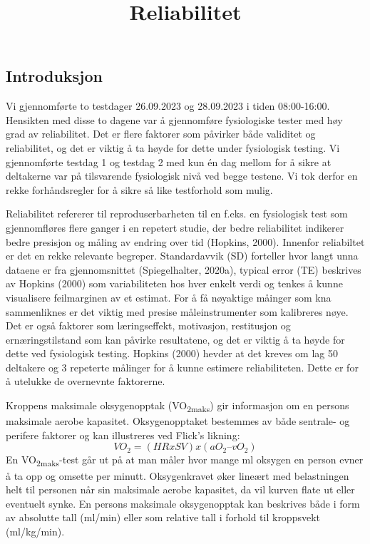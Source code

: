 \documentclass[
  letterpaper,
  DIV=11,
  numbers=noendperiod]{scrartcl}
\title{Reliabilitet}
\author{}
\date{}
\begin{document}
\maketitle
\ifdefined\Shaded\renewenvironment{Shaded}{\begin{tcolorbox}[enhanced, boxrule=0pt, sharp corners, interior hidden, frame hidden, borderline west={3pt}{0pt}{shadecolor}, breakable]}{\end{tcolorbox}}\fi

\hypertarget{introduksjon}{%
\subsection{Introduksjon}\label{introduksjon}}

Vi gjennomførte to testdager 26.09.2023 og 28.09.2023 i tiden
08:00-16:00. Hensikten med disse to dagene var å gjennomføre
fysiologiske tester med høy grad av reliabilitet. Det er flere faktorer
som påvirker både validitet og reliabilitet, og det er viktig å ta høyde
for dette under fysiologisk testing. Vi gjennomførte testdag 1 og
testdag 2 med kun én dag mellom for å sikre at deltakerne var på
tilsvarende fysiologisk nivå ved begge testene. Vi tok derfor en rekke
forhåndsregler for å sikre så like testforhold som mulig.

Reliabilitet refererer til reproduserbarheten til en f.eks. en
fysiologisk test som gjennomfløres flere ganger i en repetert studie,
der bedre reliabilitet indikerer bedre presisjon og måling av endring
over tid (Hopkins, 2000). Innenfor reliabiltet er det en rekke relevante
begreper. Standardavvik (SD) forteller hvor langt unna dataene er fra
gjennomsnittet (Spiegelhalter, 2020a), typical error (TE) beskrives av
Hopkins (2000) som variabiliteten hos hver enkelt verdi og tenkes å
kunne visualisere feilmarginen av et estimat. For å få nøyaktige måinger
som kna sammenliknes er det viktig med presise måleinstrumenter som
kalibreres nøye. Det er også faktorer som læringseffekt, motivasjon,
restitusjon og ernæringstilstand som kan påvirke resultatene, og det er
viktig å ta høyde for dette ved fysiologisk testing. Hopkins (2000)
hevder at det kreves om lag 50 deltakere og 3 repeterte målinger for å
kunne estimere reliabiliteten. Dette er for å utelukke de overnevnte
faktorerne.

Kroppens maksimale oksygenopptak (VO\textsubscript{2maks}) gir
informasjon om en persons maksimale aerobe kapasitet. Oksygenopptaket
bestemmes av både sentrale- og perifere faktorer og kan illustreres ved
Flick's likning: \[VO_2 = (HR x SV) x (aO_2 – vO_2) \] En
VO\textsubscript{2maks}-test går ut på at man måler hvor mange ml
oksygen en person evner å ta opp og omsette per minutt. Oksygenkravet
øker lineært med belastningen helt til personen når sin maksimale aerobe
kapasitet, da vil kurven flate ut eller eventuelt synke. En persons
maksimale oksygenopptak kan beskrives både i form av absolutte tall
(ml/min) eller som relative tall i forhold til kroppsvekt (ml/kg/min).
\end{document}
